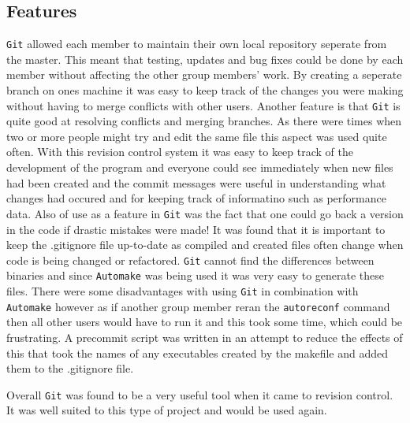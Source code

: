 \subsection{Features}
\texttt{Git} allowed each member to maintain their own local repository seperate from the master.
This meant that testing, updates and bug fixes could be done by each member without affecting the other group members' work.
By creating a seperate branch on ones machine it was easy to keep track of the changes you were making without having to merge conflicts with other users.
Another feature is that \texttt{Git} is quite good at resolving conflicts and merging branches.
As there were times when two or more people might try and edit the same file this aspect was used quite often.
With this revision control system it was easy to keep track of the development of the program and everyone could see immediately when new files had been created and the commit messages were useful in understanding what changes had occured and for keeping track of informatino such as performance data.
Also of use as a feature in \texttt{Git} was the fact that one could go back a version in the code if drastic mistakes were made!
It was found that it is important to keep the .gitignore file up-to-date as compiled and created files often change when code is being changed or refactored.
\texttt{Git} cannot find the differences between binaries and since \texttt{Automake} was being used it was very easy to generate these files.
There were some disadvantages with using \texttt{Git} in combination with \texttt{Automake} however as if another group member reran the \texttt{autoreconf} command then all other users would have to run it and this took some time, which could be frustrating.
A precommit script was written in an attempt to reduce the effects of this that took the names of any executables created by the makefile and added them to the .gitignore file.

Overall \texttt{Git} was found to be a very useful tool when it came to revision control.
It was well suited to this type of project and would be used again.
